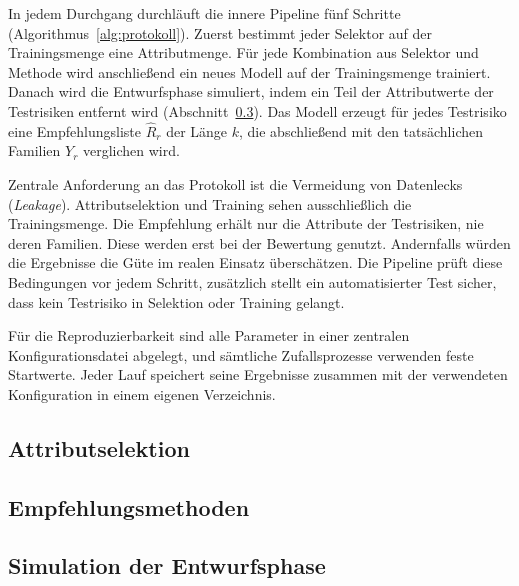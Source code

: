 In jedem Durchgang durchläuft die innere Pipeline fünf Schritte (Algorithmus~\ref{alg:protokoll}). Zuerst bestimmt jeder Selektor auf der Trainingsmenge eine Attributmenge. 
Für jede Kombination aus Selektor und Methode wird anschließend ein neues Modell auf der Trainingsmenge trainiert. 
Danach wird die Entwurfsphase simuliert, indem ein Teil der Attributwerte der Testrisiken entfernt wird (Abschnitt~\ref{sec:maskierung}).
Das Modell erzeugt für jedes Testrisiko eine Empfehlungsliste $\hat{R}_r$ der Länge $k$, die abschließend mit den tatsächlichen Familien $Y_r$ verglichen wird.

Zentrale Anforderung an das Protokoll ist die Vermeidung von Datenlecks (\emph{Leakage}). Attributselektion und Training sehen ausschließlich die Trainingsmenge. 
Die Empfehlung erhält nur die Attribute der Testrisiken, nie deren Familien. Diese werden erst bei der Bewertung genutzt. 
Andernfalls würden die Ergebnisse die Güte im realen Einsatz überschätzen. Die Pipeline prüft diese Bedingungen vor jedem Schritt, 
zusätzlich stellt ein automatisierter Test sicher, dass kein Testrisiko in Selektion oder Training gelangt.

Für die Reproduzierbarkeit sind alle Parameter in einer zentralen Konfigurationsdatei abgelegt, und sämtliche Zufallsprozesse verwenden feste Startwerte. 
Jeder Lauf speichert seine Ergebnisse zusammen mit der verwendeten Konfiguration in einem eigenen Verzeichnis.

\subsection{Attributselektion}
\label{sec:selektion}

\subsection{Empfehlungsmethoden}
\label{sec:methoden}

\subsection{Simulation der Entwurfsphase}
\label{sec:maskierung}
